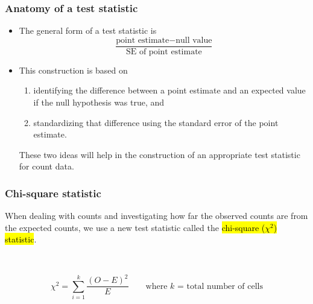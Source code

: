
\begin{frame}
\frametitle{Anatomy of a test statistic}

\begin{itemize}

\item The general form of a test statistic is
\[ \frac{\text{point estimate} - \text{null value}}{\text{SE of point estimate}} \]

\pause

\item This construction is based on 
\begin{enumerate}
\item identifying the difference between a point estimate and an expected value if the null hypothesis was true, and 
\item standardizing that difference using the standard error of the point estimate. 
\end{enumerate}
\pause

These two ideas will help in the construction of an appropriate test statistic for count data.

\end{itemize}

\end{frame}


\begin{frame}
\frametitle{Chi-square statistic}

When dealing with counts and investigating how far the observed counts are from the expected counts, we use a new test statistic called the \hl{chi-square ($\chi^2$) statistic}.

$\:$ \\

\pause

{
\[\chi^2 = \sum_{i = 1}^k \frac{(O - E)^2}{E} \qquad \text{where $k$ = total number of cells} \]
}

\end{frame}


